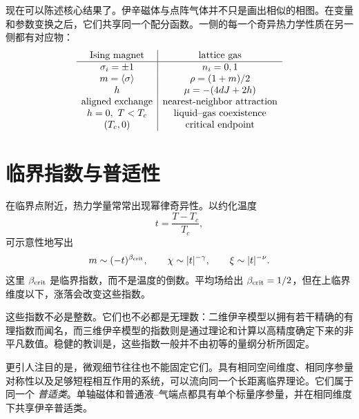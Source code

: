 \begin{classroomqa}
\end{classroomqa}

现在可以陈述核心结果了。伊辛磁体与点阵气体并不只是画出相似的相图。在变量和参数变换之后，它们共享同一个配分函数。一侧的每一个奇异热力学性质在另一侧都有对应物：
\begin{equation}
\begin{array}{c|c}
\text{Ising magnet} & \text{lattice gas}\\ \hline
\sigma_i=\pm1 & n_i=0,1\\
m=\left\langle\sigma\right\rangle & \rho=(1+m)/2\\
h & \mu=-(4dJ+2h)\\
\text{aligned exchange} & \text{nearest-neighbor attraction}\\
h=0,\ T<T_c & \text{liquid--gas coexistence}\\
(T_c,0) & \text{critical endpoint}
\end{array}
\label{eq:ising-fluid-dictionary}
\end{equation}

\section{临界指数与普适性}

在临界点附近，热力学量常常出现幂律奇异性。以约化温度
\begin{equation}
t=\frac{T-T_c}{T_c},
\end{equation}
可示意性地写出
\begin{equation}
m\sim(-t)^{\beta_{\rm crit}},
\qquad
\chi\sim |t|^{-\gamma},
\qquad
\xi\sim |t|^{-\nu}.
\label{eq:critical-exponents}
\end{equation}
这里 \(\beta_{\rm crit}\) 是临界指数，而不是温度的倒数。平均场给出 \(\beta_{\rm crit}=1/2\)，但在上临界维度以下，涨落会改变这些指数。

这些指数不必是整数。它们也不必都是无理数：二维伊辛模型以拥有若干精确的有理指数而闻名，而三维伊辛模型的指数则是通过理论和计算以高精度确定下来的非平凡数值。稳健的教训是，这些指数一般并不由初等的量纲分析所固定。

更引人注目的是，微观细节往往也不能固定它们。具有相同空间维度、相同序参量对称性以及足够短程相互作用的系统，可以流向同一个长距离临界理论。它们属于同一个 \emph{普适类}。单轴磁体和普通液--气端点都具有单个标量序参量，并在相同维度下共享伊辛普适类。

